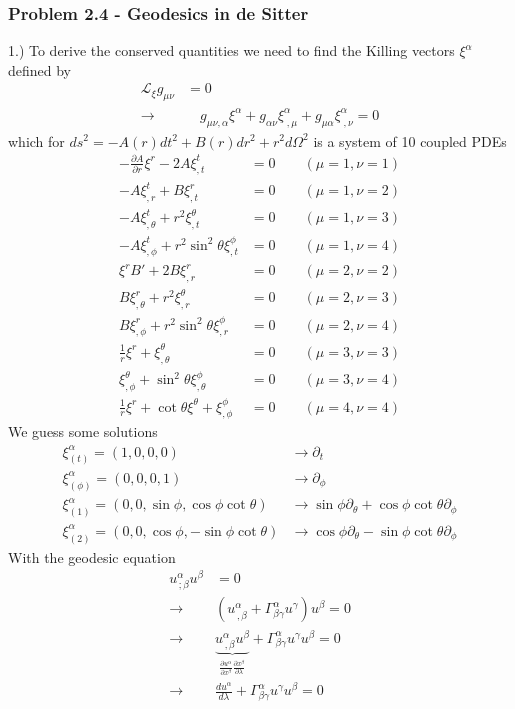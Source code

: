 \documentclass[10pt,a4paper]{book}
\theoremstyle{definition}
\begin{document}
\subsubsection{Problem 2.4 - Geodesics in de Sitter}
1.) To derive the conserved quantities we need to find the Killing vectors $\xi^\alpha$ defined by
\begin{align}
\mathcal{L}_\xi g_{\mu\nu}&=0\\
\rightarrow &\quad g_{\mu\nu,\alpha}\xi^\alpha+g_{\alpha\nu} \xi^\alpha_{\;,\mu}+g_{\mu\alpha} \xi^\alpha_{\;,\nu}=0
\end{align}
which for $ds^2=-A(r)dt^2+B(r)dr^2+r^2d\Omega^2$ is a system of 10 coupled PDEs
\begin{align}
-\frac{\partial A}{\partial r}\xi^r-2A\xi^t_{,t}&=0	\qquad(\mu=1,\nu=1)\\
-A\xi^t_{,r}+B\xi^r_{,t}&=0							\qquad(\mu=1,\nu=2)\\
-A\xi^t_{,\theta}+r^2\xi^\theta_{,t}&=0		\qquad(\mu=1,\nu=3)\\
-A\xi^t_{,\phi}+r^2\sin^2\theta\xi^\phi_{,t}&=0	\qquad(\mu=1,\nu=4)\\
%
\xi^rB'+2B\xi^r_{,r}&=0								\qquad(\mu=2,\nu=2)\\
B\xi^r_{,\theta}+r^2\xi^\theta_{,r}&=0			\qquad(\mu=2,\nu=3)\\
B\xi^r_{,\phi}+r^2\sin^2\theta\xi^\phi_{,r}&=0	\qquad(\mu=2,\nu=4)\\
%
\frac{1}{r}\xi^r+\xi^\theta_{,\theta}&=0			\qquad(\mu=3,\nu=3)\\
\xi^\theta_{,\phi}+\sin^2\theta\xi^\phi_{,\theta}&=0		\qquad(\mu=3,\nu=4)\\
%
\frac{1}{r}\xi^r+\cot\theta\xi^\theta+\xi^\phi_{,\phi}&=0	\qquad(\mu=4,\nu=4)
\end{align}
We guess some solutions
\begin{align}
\xi^\alpha_{(t)}=(1,0,0,0)&\rightarrow\partial_t\\
\xi^\alpha_{(\phi)}=(0,0,0,1)&\rightarrow\partial_\phi\\
\xi^\alpha_{(1)}=(0,0,\sin\phi,\cos\phi\cot\theta)&\rightarrow\sin\phi\partial_\theta+\cos\phi\cot\theta\partial_\phi\\
\xi^\alpha_{(2)}=(0,0,\cos\phi,-\sin\phi\cot\theta)&\rightarrow\cos\phi\partial_\theta-\sin\phi\cot\theta\partial_\phi
\end{align}
With the geodesic equation
\begin{align}
u^\alpha_{\,;\beta}u^\beta&=0\\
\rightarrow\quad& (u^\alpha_{\,,\beta}+\Gamma^\alpha_{\beta\gamma}u^\gamma)u^\beta=0\\
\rightarrow\quad& \underbrace{u^\alpha_{\,,\beta}u^\beta}_{\frac{\partial u^\alpha}{\partial x^\beta}\frac{\partial x^\beta}{\partial \lambda}}+\Gamma^\alpha_{\beta\gamma}u^\gamma u^\beta=0\\
\rightarrow\quad& \frac{du^\alpha}{d\lambda}+\Gamma^\alpha_{\beta\gamma}u^\gamma u^\beta=0
\end{align}
\end{document}
